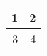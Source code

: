 \begin{tabular}{|r||r|}
\hline
1   & 2 \bigstrut\\
\hline
3   & 4 \bigstrut\\
\hline
\end{tabular}%
